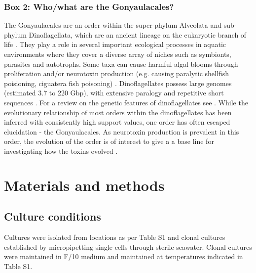 \documentclass[12pt]{article}
\begin{document}
\subsubsection*{Box 2: Who/what are the Gonyaulacales?}
The Gonyaulacales are an order within the super-phylum Alveolata and sub-phylum Dinoflagellata, which are an ancient lineage on the eukaryotic branch of life \cite{moldowan1998biogeochemical}. 
They play a role in several important ecological processes in aquatic environments where they cover a diverse array of niches such as symbionts, parasites and autotrophs. 
Some taxa can cause harmful algal blooms through proliferation and/or neurotoxin production (e.g. causing paralytic shellfish poisioning, ciguatera fish poisoning) \cite{murray2016unravelling}.
Dinoflagellates possess large genomes (estimated 3.7 to 220 Gbp), with extensive paralogy and repetitive short sequences  \cite{casabianca2017genome,murray2016unravelling}. 
For a review on the genetic features of dinoflagellates see \cite{murray2016unravelling}. 
While the evolutionary relationship of most orders within the dinoflagellates has been inferred with consistently high support values, one order has often escaped elucidation - the Gonyaulacales. 
As neurotoxin production is prevalent in this order, the evolution of the order is of interest to give a a base line for investigating how the toxins evolved \cite{shalchian2006combined,zhang2007three,saldarriaga2004molecular,hoppenrath2010dinoflagellate,murray2005improving}. 

\newpage
\section{Materials and methods}
\subsection*{Culture conditions}
\FloatBarrier
Cultures were isolated from locations as per Table S1 and clonal cultures established by micropipetting single cells through sterile seawater. 
Clonal cultures were maintained in F/10 medium and maintained at temperatures indicated in Table S1. 
\end{document}
